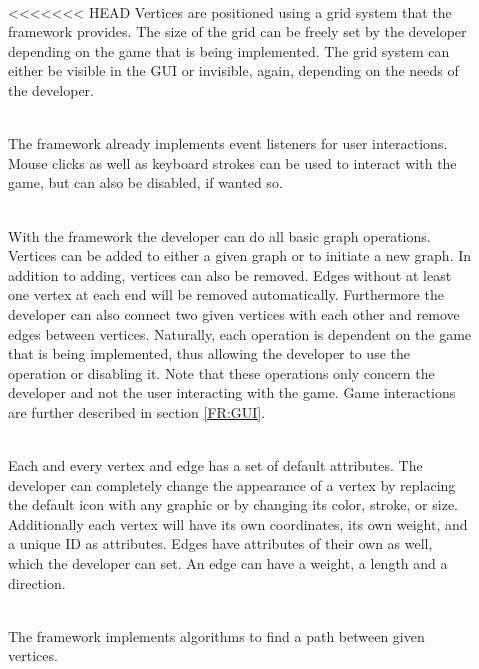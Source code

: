 \begin{description}
	\item[] \textbf{} \\
<<<<<<< HEAD
	Vertices are positioned using a grid system that the \gls{framework} provides. The size of the grid can be freely set by the developer depending on the game that is being implemented. The grid system can either be visible in the \gls{GUI} or invisible, again, depending on the needs of the developer.
	\item[] \textbf{} \\
	The framework already implements event listeners for user interactions. Mouse clicks as well as keyboard strokes can be used to interact with the game, but can also be disabled, if wanted so.
  	\item[] \textbf{} \\
	With the framework the developer can do all basic graph operations. Vertices can be added to either a given graph or to initiate a new graph. In addition to adding, vertices can also be removed. Edges without at least one vertex at each end will be removed automatically. Furthermore the developer can also connect two given vertices with each other and remove edges between vertices. Naturally, each operation is dependent on the game that is being implemented, thus allowing the developer to use the operation or disabling it. Note that these operations only concern the developer and not the user interacting with the game. Game interactions are further described in section \ref{FR:GUI}.
	\item[] \textbf{} \\
	Each and every vertex and edge has a set of default attributes. The developer can completely change the appearance of a vertex by replacing the default icon with any graphic or by changing its color, stroke, or size. Additionally each vertex will have its own coordinates, its own weight, and a unique \gls{ID} as attributes. Edges have attributes of their own as well, which the developer can set. An edge can have a weight, a length and a direction.
	\item[] \textbf{} \\
	The framework implements algorithms to find a \gls{path} between given vertices.

\end{description}
